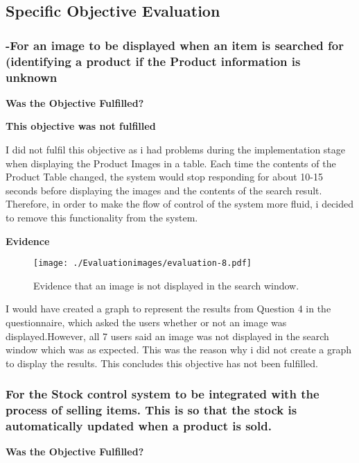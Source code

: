 \pagebreak
\subsection{Specific Objective Evaluation}



\subsubsection{-For an image to be displayed when an item is searched for (identifying a product if the Product information is unknown}
\textbf{Was the Objective Fulfilled?} \newline


\textbf{\large{This objective was not fulfilled}}

I did not fulfil this objective as i had problems during the implementation stage when displaying the Product Images in a table. Each time the contents of the Product Table changed, the system would stop responding for about 10-15 seconds before displaying the images and the contents of the search result. Therefore, in order to make the flow of control of the system more fluid, i decided to remove this functionality from the system. \newline

\textbf{Evidence} \newline

\begin{figure}[H]
\caption{Evidence that an image is not displayed in the search window.} \label{fig:evaluation-8}
\hfill\texttt{[image: ./Evaluationimages/evaluation-8.pdf]}
\end{figure}

I would have created a graph to represent the results from Question 4 in the questionnaire, which asked the users whether or not an image was displayed.However, all 7 users said an image was not displayed in the search window which was as expected. This was the reason why i did not create a graph to display the results.  This concludes this objective has not been fulfilled.



\pagebreak
\subsubsection{For the Stock control system to be integrated with the process of selling items. This is so that the stock is automatically updated when a product is sold.}
\label{For the Stock control system to be integrated with the process of selling items. This is so that the stock is automatically updated when a product is sold.}
\textbf{Was the Objective Fulfilled?} \newline

